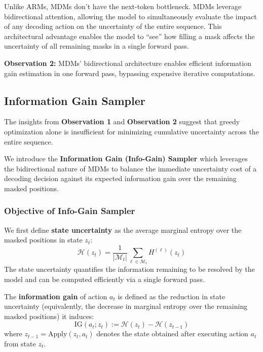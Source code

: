 Unlike ARMs, MDMs don't have the next-token bottleneck. MDMs leverage bidirectional attention, allowing the model to simultaneously evaluate the impact of any decoding action on the uncertainty of the entire sequence. This architectural advantage enables the model to “see” how filling a mask affects the uncertainty of all remaining masks in a single forward pass.

\begin{observationbox}
\textbf{Observation 2:}\label{obs:obs2} MDMs' bidirectional architecture enables efficient information gain estimation in one forward pass, bypassing expensive iterative computations.
\end{observationbox}

\subsection{Information Gain Sampler}  

\label{sec:method_info_gain}
The insights from \textbf{Observation 1} and \textbf{Observation 2} suggest that greedy optimization alone is insufficient for minimizing cumulative uncertainty across the entire sequence. 

We introduce the \textbf{Information Gain (Info-Gain) Sampler} which leverages the bidirectional nature of MDMs to balance the immediate uncertainty cost of a decoding decision against its expected information gain over the remaining masked positions.

\subsubsection{Objective of Info-Gain Sampler}
We first define \textbf{state uncertainty} as the average marginal entropy over the masked positions in state $z_t$:
\begin{equation}
\mathcal{H}(z_t)=\frac{1}{|\mathcal{M}_{t}|} \sum_{\ell \in \mathcal{M}_{t}} H^{(\ell)}(z_t)
\end{equation}
The state uncertainty quantifies the information remaining to be resolved by the model and can be computed efficiently via a single forward pass. 

The \textbf{information gain} of action $a_t$ is defined as the reduction in state uncertainty (equivalently, the decrease in marginal entropy over the remaining masked positions) it induces:
\begin{equation}
    \text{IG}(a_t ; z_t) := \mathcal{H}(z_t) - \mathcal{H}(z_{t-1})
\end{equation}
where $z_{t-1} = \text{Apply}(z_t, a_t)$ denotes the state obtained after executing action $a_t$ from state $z_t$.

